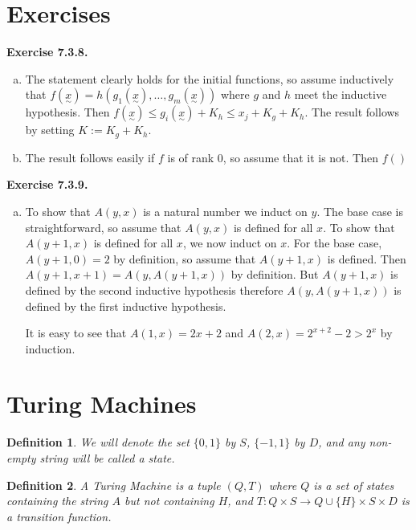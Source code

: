 \documentclass[leqno]{article}
\newtheorem{definition}{Definition}[section]
\newcommand{\set}[1]{\{#1\}}
\newcommand{\exc}[1]{\textbf{Exercise #1.}}
\newcommand{\utilde}[1]{\underset{\sim}{#1}}
\begin{document}
\section{Exercises}

\exc{7.3.8}
\begin{enumerate}[(a)]
    \item The statement clearly holds for the initial functions, so assume inductively that $f(\utilde{x}) = h(g_1(\utilde{x}), \dots, g_m(\utilde{x}))$ where $g$ and $h$ meet the inductive hypothesis. Then $f(\utilde{x}) \leq g_i(\utilde{x}) + K_h \leq x_j + K_g + K_h$. The result follows by setting $K := K_g + K_h$.
    
    \item The result follows easily if $f$ is of rank $0$, so assume that it is not. Then $f()$
\end{enumerate}

\exc{7.3.9}
\begin{enumerate}[(a)]
    \item To show that $A(y, x)$ is a natural number we induct on $y$. The base case is straightforward, so assume that $A(y, x)$ is defined for all $x$. To show that $A(y+1, x)$ is defined for all $x$, we now induct on $x$. For the base case, $A(y+1, 0) = 2$ by definition, so assume that $A(y+1, x)$ is defined. Then $A(y+1, x+1) = A(y, A(y+1, x))$ by definition. But $A(y+1, x)$ is defined by the second inductive hypothesis therefore $A(y, A(y+1, x))$ is defined by the first inductive hypothesis.
    
    It is easy to see that $A(1, x) = 2x + 2$ and $A(2, x) = 2^{x+2}-2 > 2^x$ by induction.
\end{enumerate}

\section{Turing Machines}

\begin{definition}
  We will denote the set $\set{0, 1}$ by $S$, $\set{-1, 1}$ by $D$, and any non-empty string will be called a state.
\end{definition}

\begin{definition}
  A Turing Machine is a tuple $(Q, T)$ where $Q$ is a set of states containing the string $A$ but not containing $H$, and $T: Q \times S \to Q \cup \set{H} \times S \times D$ is a transition function.
\end{definition}
\end{document}
